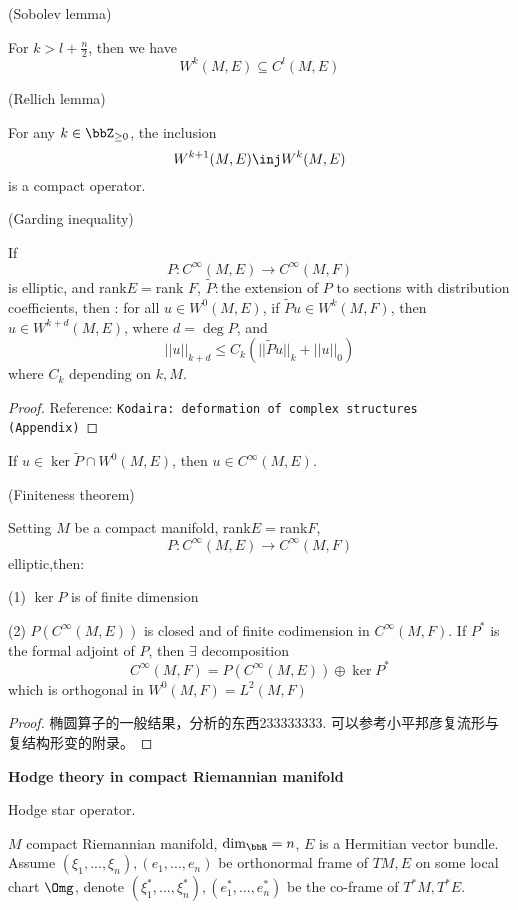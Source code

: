 \begin{lemma}(Sobolev lemma)

For $k>l+\frac{n}{2}$, then we have 
$$W^k(M,E)\subseteq C^l(M,E)$$
\end{lemma}

\begin{lemma}(Rellich lemma)

For any $k\in\bbZ_{\geq 0}$, the inclusion 
$$W^{k+1}(M,E)\inj W^k(M,E)$$
is a compact operator.
\end{lemma}

\begin{lemma}(Garding inequality)

If
$$P:C^\infty(M,E)\to C^\infty(M,F)$$
is elliptic, and rank$E=$rank $F$,
$\tilde{P}:$the extension of $P$ to sections with distribution coefficients, then :
for all $u\in W^0(M,E)$, if $\tilde{P}u\in W^k(M,F)$, then 
$u\in W^{k+d}(M,E)$, where $d=\deg P$, and
$$||u||_{k+d}\leq C_k
\left(
  ||\tilde{P}u||_k+||u||_0
\right)
$$
where $C_k$ depending on $k,M$.
\end{lemma}

\begin{proof}
Reference: \verb"Kodaira: deformation of complex structures (Appendix)"
\end{proof}

\begin{cor}
If $u\in\ker\tilde{P}\cap W^0(M,E)$, then $u\in C^\infty(M,E)$.
\end{cor}

\begin{lemma}(Finiteness theorem)

Setting $M$ be a compact manifold, rank$E=$rank$F$,
$$P:C^\infty(M,E)\to C^\infty(M,F)$$
elliptic,then:

(1) $\ker P$ is of finite dimension

(2) $P(C^\infty(M,E))$ is closed and of finite codimension in $C^\infty(M,F)$.
If $P^*$ is the formal adjoint of $P$, then $\exists$ decomposition 
$$C^\infty(M,F)=P(C^\infty(M,E))\oplus\ker P^*$$
which is orthogonal in $W^0(M,F)=L^2(M,F)$
\end{lemma}
\begin{proof}
椭圆算子的一般结果，分析的东西233333333.
可以参考小平邦彦复流形与复结构形变的附录。
\end{proof}

\textbf{Hodge theory in compact Riemannian manifold}

Hodge star operator. 

$M$ compact Riemannian manifold, $\dim_{\bbR}=n$, $E$ is a Hermitian vector bundle.
Assume $(\xi_1,...,\xi_n),(e_1,...,e_n)$ be orthonormal frame of $TM, E$
on some local chart $\Omg$, denote 
$(\xi_1^*,...,\xi_n^*),(e_1^*,...,e_n^*)$ be the co-frame of 
$T^*M,T^*E$. 


